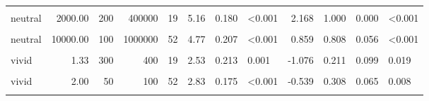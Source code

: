 \documentclass[
]{article}
\begin{document}
\begin{longtable}[t]{lrrrrrrlrrrl}
\hspace{1em}\cellcolor{gray!10}{neutral} & \cellcolor{gray!10}{2000.00} & \cellcolor{gray!10}{20} & \cellcolor{gray!10}{40000} & \cellcolor{gray!10}{52} & \cellcolor{gray!10}{4.92} & \cellcolor{gray!10}{0.182} & \cellcolor{gray!10}{<0.001} & \cellcolor{gray!10}{1.098} & \cellcolor{gray!10}{0.865} & \cellcolor{gray!10}{0.048} & \cellcolor{gray!10}{<0.001}\\
\hspace{1em}neutral & 2000.00 & 200 & 400000 & 19 & 5.16 & 0.180 & <0.001 & 2.168 & 1.000 & 0.000 & <0.001\\
\hspace{1em}\cellcolor{gray!10}{neutral} & \cellcolor{gray!10}{10000.00} & \cellcolor{gray!10}{30} & \cellcolor{gray!10}{300000} & \cellcolor{gray!10}{19} & \cellcolor{gray!10}{5.21} & \cellcolor{gray!10}{0.279} & \cellcolor{gray!10}{<0.001} & \cellcolor{gray!10}{1.447} & \cellcolor{gray!10}{0.895} & \cellcolor{gray!10}{0.074} & \cellcolor{gray!10}{<0.001}\\
\hspace{1em}neutral & 10000.00 & 100 & 1000000 & 52 & 4.77 & 0.207 & <0.001 & 0.859 & 0.808 & 0.056 & <0.001\\
\hspace{1em}\cellcolor{gray!10}{vivid} & \cellcolor{gray!10}{1.33} & \cellcolor{gray!10}{30} & \cellcolor{gray!10}{40} & \cellcolor{gray!10}{52} & \cellcolor{gray!10}{2.21} & \cellcolor{gray!10}{0.174} & \cellcolor{gray!10}{<0.001} & \cellcolor{gray!10}{-1.037} & \cellcolor{gray!10}{0.173} & \cellcolor{gray!10}{0.053} & \cellcolor{gray!10}{<0.001}\\
\hspace{1em}vivid & 1.33 & 300 & 400 & 19 & 2.53 & 0.213 & 0.001 & -1.076 & 0.211 & 0.099 & 0.019\\
\hspace{1em}\cellcolor{gray!10}{vivid} & \cellcolor{gray!10}{2.00} & \cellcolor{gray!10}{20} & \cellcolor{gray!10}{40} & \cellcolor{gray!10}{19} & \cellcolor{gray!10}{2.58} & \cellcolor{gray!10}{0.240} & \cellcolor{gray!10}{0.003} & \cellcolor{gray!10}{-0.905} & \cellcolor{gray!10}{0.211} & \cellcolor{gray!10}{0.099} & \cellcolor{gray!10}{0.019}\\
\hspace{1em}vivid & 2.00 & 50 & 100 & 52 & 2.83 & 0.175 & <0.001 & -0.539 & 0.308 & 0.065 & 0.008\\
\hspace{1em}\cellcolor{gray!10}{vivid} & \cellcolor{gray!10}{3.00} & \cellcolor{gray!10}{10} & \cellcolor{gray!10}{30} & \cellcolor{gray!10}{19} & \cellcolor{gray!10}{2.90} & \cellcolor{gray!10}{0.259} & \cellcolor{gray!10}{0.055} & \cellcolor{gray!10}{-0.550} & \cellcolor{gray!10}{0.421} & \cellcolor{gray!10}{0.120} & \cellcolor{gray!10}{0.648}\\

\end{longtable}
\end{document}
